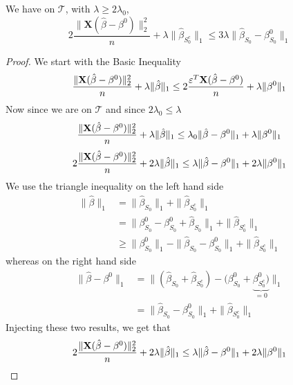 \begin{lemma}[Lemma 6.3.]
    We have on $\mathscr{T}$, with $\lambda \geq 2 \lambda_{0}$,
    $$
        2\frac{ \|\mathbf{X} (\hat{\beta}-\beta^{0} ) \|_{2}^{2}}{n} + \lambda \|\hat{\beta}_{S_{0}^{c}} \|_{1} \leq 3 \lambda \|\hat{\beta}_{S_{0}}-\beta_{S_{0}}^{0} \|_{1}
    $$
\end{lemma}
\begin{proof}
    We start with the Basic Inequality
    $$
        \frac{\| \mathbf{X} (\hat{\beta}-\beta^{0})\|_{2}^{2}}{n} + \lambda\|\hat{\beta}\|_{1} \leq 2 \frac{\varepsilon^{T} \mathbf{X} (\hat{\beta}-\beta^{0})}{n}+\lambda\|\beta^{0}\|_{1}
    $$
    Now since we are on $\mathscr{T}$ and since $2 \lambda_0 \leq \lambda$
    $$
        \frac{\| \mathbf{X} (\hat{\beta}-\beta^{0})\|_{2}^{2}}{n} + \lambda\|\hat{\beta}\|_{1} \leq \lambda_0 \|\hat{\beta}-\beta^{0}\|_1 + \lambda\|\beta^{0}\|_{1}
    $$
    $$
        2 \frac{\| \mathbf{X} (\hat{\beta}-\beta^{0})\|_{2}^{2}}{n}+2 \lambda\|\hat{\beta}\|_{1} \leq \lambda \|\hat{\beta}-\beta^{0} \|_{1}+2 \lambda \|\beta^{0} \|_{1}
    $$
    We use the triangle inequality on the left hand side
    \begin{align*}
        \|\hat{\beta}\|_{1}
         & = \|\hat{\beta}_{S_{0}} \|_{1} + \|\hat{\beta}_{S_{0}^{c}} \|_{1}                                                  \\
         & = \|\beta_{S_{0}}^{0} - \beta_{S_{0}}^{0} + \hat{\beta}_{S_{0}} \|_{1} + \|\hat{\beta}_{S_{0}^{c}} \|_{1}          \\
         & \geq \|\beta_{S_{0}}^{0} \|_{1} - \|\hat{\beta}_{S_{0}}-\beta_{S_{0}}^{0} \|_{1}+ \|\hat{\beta}_{S_{0}^{c}} \|_{1}
    \end{align*}
    whereas on the right hand side
    \begin{align*}
        \|\hat{\beta}-\beta^{0} \|_{1}
         & =  \| (\hat{\beta}_{S_{0}} + \hat{\beta}_{S_{0}^{c}}) - (\beta_{S_{0}}^{0} + \underbrace{\beta_{S_{0}^{c}}^0)}_{=0} \|_{1} \\
         & =  \| \hat{\beta}_{S_{0}}-\beta_{S_{0}}^{0} \|_{1} + \|\hat{\beta}_{S_{0}^{c}} \|_{1}
    \end{align*}
    Injecting these two results, we get that
    \begin{align*}
                 & 2 \frac{\| \X (\hat{\beta}-\beta^{0})\|_{2}^{2}}{n} + 2 \lambda\|\hat{\beta}\|_{1} \leq \lambda \|\hat{\beta}-\beta^{0} \|_{1}+2 \lambda \|\beta^{0} \|_{1}                                                                                                  \\

\end{align*}
\end{proof}
